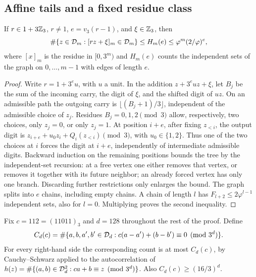 \subsection{Affine tails and a fixed residue class}
\begin{lemma}\label{ep:affine}
If $r\in1+3\mathbb Z_3$, $r\ne1$, $e=v_3(r-1)$, and $\xi\in\mathbb Z_3$, then
\[
 \#\{z\in\mathcal D_m:[rz+\xi]_m\in\mathcal D_m\}
 \le H_m(e)\le\varphi^m(2/\varphi)^e,
\]
where $[x]_m$ is the residue in $[0,3^m)$ and $H_m(e)$ counts the
independent sets of the graph on $0,\ldots,m-1$ with edges of length $e$.
\end{lemma}
\begin{proof}
Write $r=1+3^eu$, with $u$ a unit. In the addition
$z+3^euz+\xi$, let $B_j$ be the sum of the incoming carry,
the digit of $\xi$, and the shifted digit of $uz$.
On an admissible path the outgoing carry is
$\lfloor(B_j+1)/3\rfloor$, independent of the admissible choice of
$z_j$. Residues $B_j=0,1,2\pmod3$ allow, respectively, two choices,
only $z_j=0$, or only $z_j=1$.
At position $i+e$, after fixing $z_{<i}$, the output digit is
$z_{i+e}+u_0z_i+Q_i(z_{<i})\pmod3$, with $u_0\in\{1,2\}$.
Thus one of the two choices at $i$ forces the digit at $i+e$,
independently of intermediate admissible digits. Backward induction
on the remaining positions bounds the tree by the independent-set
recursion: at a free vertex one either removes that vertex, or removes
it together with its future neighbor; an already forced vertex has
only one branch. Discarding further restrictions only enlarges the
bound. The graph splits into $e$ chains, including empty chains.
A chain of length $l$ has $F_{l+2}\le2\varphi^{l-1}$ independent sets,
also for $l=0$. Multiplying proves the second inequality.
\end{proof}

Fix $c=112=(11011)_3$ and $d=128$ throughout the rest of the proof.
Define
\[
 C_d(c)=\#\{a,b,a',b'\in\mathcal D_d:
              c(a-a')+(b-b')\equiv0\pmod{3^d}\}.
\]
For every right-hand side the corresponding count is at most $C_d(c)$,
by Cauchy--Schwarz applied to the autocorrelation of
$h(z)=\#\{(a,b)\in\mathcal D_d^2:ca+b\equiv z\pmod{3^d}\}$.
Also $C_d(c)\ge(16/3)^d$.

